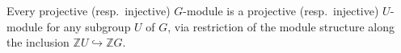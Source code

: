 Every projective (resp.\ injective) $G$-module is a projective (resp.\ injective) $U$-module for any subgroup $U$ of $G$, via restriction of the module structure along the inclusion $\mathbb{Z}U \hookrightarrow \mathbb{Z}G$.
